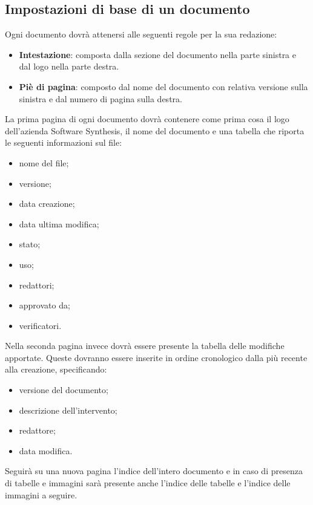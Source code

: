 \subsection{Impostazioni di base di un documento}
Ogni documento dovrà attenersi alle seguenti regole per la sua redazione:
\begin{itemize}
\item \textbf{Intestazione}: composta dalla sezione del documento nella parte sinistra e dal logo nella parte destra.
\item \textbf{Piè di pagina}: composto dal nome del documento con relativa versione sulla sinistra  e dal numero di pagina sulla destra.
\end{itemize}
La prima pagina di ogni documento dovrà contenere come prima cosa il logo dell'azienda Software Synthesis, il nome del documento e una tabella che riporta le seguenti informazioni sul file:
\begin{itemize}
\item nome del file;
\item versione;
\item data creazione;
\item data ultima modifica;
\item stato;
\item uso;
\item redattori;
\item approvato da;
\item verificatori.
\end{itemize}

Nella seconda pagina invece dovrà essere presente la tabella delle modifiche apportate. Queste dovranno essere inserite in ordine cronologico dalla più recente alla creazione, specificando:
\begin{itemize}
\item versione del documento;
\item descrizione dell'intervento;
\item redattore;
\item data modifica.
\end{itemize}
Seguirà su una nuova pagina l'indice dell'intero documento e in caso di presenza di tabelle e immagini sarà presente anche l'indice delle tabelle e l'indice delle immagini a seguire.

